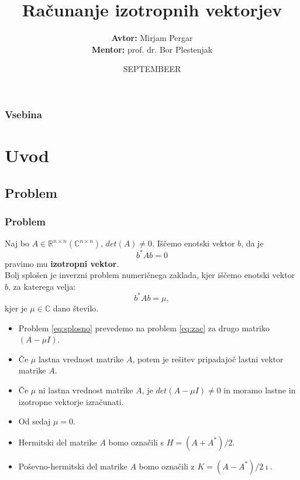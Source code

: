 \documentclass{beamer}
\title[Računanje izotropnih vektorjev] %
{Računanje izotropnih vektorjev}
\author[Mirjam Pergar] %
{\textbf{Avtor:}  Mirjam Pergar\\
\textbf{Mentor:} prof. dr. Bor Plestenjak
}
\institute[Fakuleta za matematiko in fiziko] %
\date[SEPTEMBERRRR] %
{SEPTEMBEER}
\newcommand{\R}{\mathbb R}
\newcommand{\C}{\mathbb C}
\begin{document}
\begin{frame}
  \titlepage
\end{frame}

\begin{frame}
  \frametitle{Vsebina}
  \tableofcontents
\end{frame}


\section{Uvod}
\subsection{Problem}
\begin{frame}
  \frametitle{Problem}
\begin{alertblock}{}
Naj bo $A\in\R^{n\times n} (\C^{n\times n})$, $det(A)\ne 0$. Iščemo enotski vektor $b$, da je
\begin{equation}\label{eq:zac}
b^\ast Ab=0
\end{equation}
pravimo mu \textbf{izotropni vektor}. \medskip \\
Bolj splošen je inverzni problem numeričnega zaklada, kjer iščemo enotski vektor $b$, za katerega velja:
\begin{equation}\label{eq:splosno}
b^\ast Ab=\mu,
\end{equation}
kjer je $\mu \in \C$ dano število.
\end{alertblock}
\end{frame}
\begin{frame}
\begin{itemize}
\item Problem \eqref{eq:splosno} prevedemo na problem \eqref{eq:zac} za drugo matriko $ (A-\mu I)$.\medskip
\item Če $\mu$ lastna vrednost matrike $A$, potem je rešitev pripadajoč lastni vektor matrike $A$.\medskip
\item Če $\mu$ ni lastna vrednost matrike $A$, je $det(A-\mu I)\ne 0$ in moramo lastne in izotropne vektorje izračunati.\medskip
\item Od sedaj  $\mu =0$.\medskip
\item Hermitski del matrike $A$ bomo označili s $H=(A+A^\ast)/2$.\medskip
\item Poševno-hermitski del matrike $A$ bomo označili z \medskip$K=(A-A^\ast)/2\imath$.
\end{itemize}
\end{frame}
\end{document}
